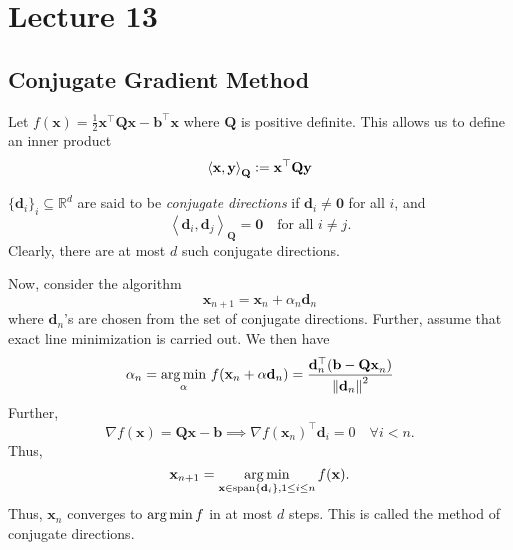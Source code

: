 \section{Lecture 13}

\subsection*{Conjugate Gradient Method}

Let $f(\mathbf{x}) = \frac{1}{2} \mathbf{x}^{\top} \mathbf{Q} \mathbf{x} - \mathbf{b}^{\top} \mathbf{x}$ where $\mathbf{Q}$ is positive definite. This allows us to define an inner product
\[
    \left\langle \mathbf{x}, \mathbf{y} \right\rangle_{\mathbf{Q}} \vcentcolon= \mathbf{x}^{\top} \mathbf{Q} \mathbf{y}
\]
\begin{defn}
    $\{ \mathbf{d}_i \}_i \subseteq \mathbb{R}^d$ are said to be \emph{conjugate directions} if $\mathbf{d}_i \neq \mathbf{0}$ for all $i$, and
    \[
        \left\langle \mathbf{d}_i, \mathbf{d}_j \right\rangle_{\mathbf{Q}} = \mathbf{0} \quad \text{for all } i \neq j.
    \]
    Clearly, there are at most $d$ such conjugate directions.
\end{defn}

Now, consider the algorithm
\[
    \mathbf{x}_{n+1} = \mathbf{x}_n + \alpha_n \mathbf{d}_n
\]
where $\mathbf{d}_n$'s are chosen from the set of conjugate directions. Further, assume that exact line minimization is carried out. We then have
\[
    \alpha_n = \operatorname*{arg\,min}_{\alpha} \, f(\mathbf{x}_n + \alpha \mathbf{d}_n) = \frac{\mathbf{d}_n^{\top} (\mathbf{b} - \mathbf{Qx}_n)}{\norm{\mathbf{d}_n}^2}
\]
Further, 
\[
    \nabla f(\mathbf{x}) = \mathbf{Qx} - \mathbf{b} \implies \nabla f(\mathbf{x}_n)^{\top} \mathbf{d}_i = 0 \quad \forall i < n.
\]
Thus, 
\[
    \mathbf{x}_{n+1} = \operatorname*{arg\,min}_{\mathbf{x} \in \operatorname*{span}\{\mathbf{d}_i\}, 1 \leq i \leq n} f(\mathbf{x}).
\]
Thus, $\mathbf{x}_n$ converges to $\operatorname*{arg\,min} f$ in at most $d$ steps. This is called the method of conjugate directions.

